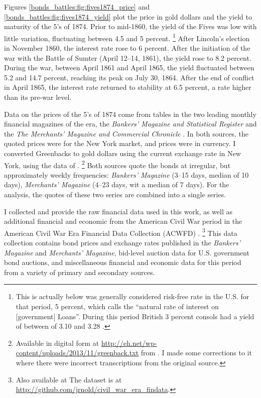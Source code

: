 Figures \ref{bonds_battles:fig:fives1874_price} and \ref{bonds_battles:fig:fives1874_yield} plot the price in gold dollars and the yield to maturity of the 5's of 1874.
Prior to mid-1860, the yield of the Fives was low with little variation, fluctuating between 4.5 and 5 percent.%
\footnote{
  This is actually below was generally considered risk-free rate in the U.S. for that period, 5 percent, which \textcite[29]{Elder1863} calls the ``natural rate of interest on [government] Loans''.
  During this period British 3 percent consols had a yield of between of 3.10 and 3.28 \parencite[193]{HomerSylla2005}.
}
After Lincoln's election in November 1860,  the interest rate rose to 6 percent.
After the initiation of the war with the Battle of Sumter (April 12--14, 1861), the yield rose to 8.2 percent.
During the war, between April 1861 and April 1865, the yield fluctuated between 5.2 and 14.7 percent, reaching its peak on July 30, 1864.
After the end of conflict in April 1865, the interest rate returned to stability at 6.5 percent, a rate higher than its pre-war level.

Data on the prices of the 5's of 1874 come from tables in the two leading monthly financial magazines of the era, the \textit{Bankers' Magazine and Statistical Register} and the \textit{The Merchants' Magazine and Commercial Chronicle} \parencites[186]{Mitchell1903}.
In both sources, the quoted prices were for the New York market, and prices were in currency.
I converted Greenbacks to gold dollars using the current exchange rate in New York, using the data of \textcite{Mitchell1908}.%
\footnote{
  Available in digital form at \url{http://eh.net/wp-content/uploads/2013/11/greenback.txt} from \textcite{WillardGuinnaneEtAl1996}.
  I made some corrections to it where there were incorrect transcriptions from the original source.
}
Both sources quote the bonds at irregular, but approximately weekly frequencies: \textit{Bankers' Magazine} (3--15 days, median of 10 days), \textit{Merchants' Magazine} (4--23 days, wit a median of 7 days).
For the analysis, the quotes of these two series are combined into a single series.

I collected and provide the raw financial data used in this work, as well as additional financial and economic from the American Civil War period in the American Civil War Era Financial Data Collection (ACWFD) \parencite{Arnold2015a}.%
\footnote{Also available at The dataset is at \url{http://github.com/jrnold/civil_war_era_findata}.}
This data collection contains bond prices and exchange rates published in the \textit{Bankers' Magazine} and \textit{Merchants' Magazine}, bid-level auction data for U.S. government bond auctions, and miscellaneous financial and economic data for this period from a variety of primary and secondary sources.

